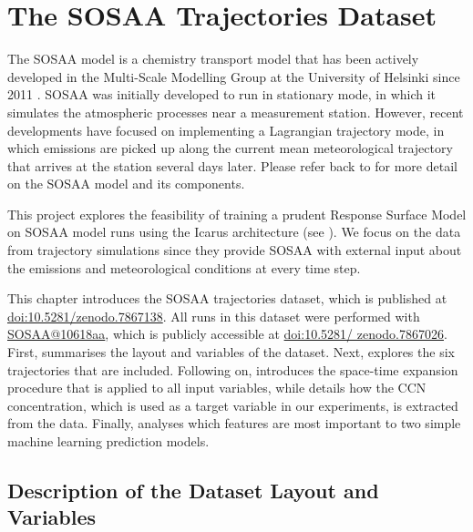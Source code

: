 \chapter{The SOSAA Trajectories Dataset} \label{txt:sosaa-data-chapter}

The SOSAA model is a chemistry transport model that has been actively developed in the Multi-Scale Modelling Group at the University of Helsinki since 2011 \cite{sosa-description-2011}. SOSAA was initially developed to run in stationary mode, in which it simulates the atmospheric processes near a measurement station. However, recent developments have focused on implementing a Lagrangian trajectory mode, in which emissions are picked up along the current mean meteorological trajectory that arrives at the station several days later. Please refer back to  for more detail on the SOSAA model and its components.

This project explores the feasibility of training a prudent Response Surface Model on SOSAA model runs using the Icarus architecture (see ). We focus on the data from trajectory simulations since they provide SOSAA with external input about the emissions and meteorological conditions at every time step.

\newpar This chapter introduces the SOSAA trajectories dataset, which is published at \href{https://doi.org/10.5281/zenodo.7867138}{doi:10.5281/zenodo.7867138}. All runs in this dataset were performed with \href{https://version.helsinki.fi/putian.zhou/sosaa/-/tree/10618aa98c7470546308adf132afb0bc0735b4eb}{SOSAA@10618aa}, which is publicly accessible at \href{https://doi.org/10.5281/zenodo.7867026}{doi:10.5281/ zenodo.7867026}. First,  summarises the layout and variables of the dataset. Next,  explores the six trajectories that are included. Following on,  introduces the space-time expansion procedure that is applied to all input variables, while  details how the CCN concentration, which is used as a target variable in our experiments, is extracted from the data. Finally,  analyses which features are most important to two simple machine learning prediction models.

\section{Description of the Dataset Layout and Variables} \label{txt:data-layout-variables}

